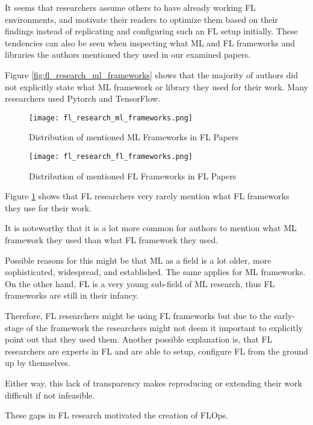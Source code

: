 It seems that researchers assume others to have already working FL environments,
and motivate their readers to optimize them based on their findings
instead of replicating and configuring such an FL setup initially.
These tendencies can also be seen when inspecting what ML and FL frameworks and libraries
the authors mentioned they used in our examined papers.

Figure \ref{fig:fl_research_ml_frameworks} shows that the majority of authors
did not explicitly state what ML framework or library they used for their work.
Many researchers used Pytorch and TensorFlow.

\begin{figure}[p]
    \centering
    \texttt{[image: fl\_research\_ml\_frameworks.png]}
    \caption{Distribution of mentioned ML Frameworks in FL Papers}
    \label{fig:fl_research_ml_frameworks}

    \texttt{[image: fl\_research\_fl\_frameworks.png]}
    \caption{Distribution of mentioned FL Frameworks in FL Papers}
    \label{fig:fl_research_fl_frameworks}
\end{figure}

Figure \ref{fig:fl_research_fl_frameworks} shows that FL researchers
very rarely mention what FL frameworks they use for their work.

It is noteworthy that it is a lot more common for authors to mention what ML 
framework they used than what FL framework they used.

Possible reasons for this might be that ML as a field is a lot older, more sophisticated,
widespread, and established.
The same applies for ML frameworks.
On the other hand, FL is a very young sub-field of ML research,
thus FL frameworks are still in their infancy.

Therefore, FL researchers might be using FL frameworks but due to the early-stage 
of the framework the researchers might not deem it important to explicitly point out that they used them.
Another possible explanation is, that FL researchers are experts in FL and
are able to setup, configure FL from the ground up by themselves.

Either way, this lack of transparency makes reproducing or extending
their work difficult if not infeasible.

These gaps in FL research motivated the creation of FLOps.
